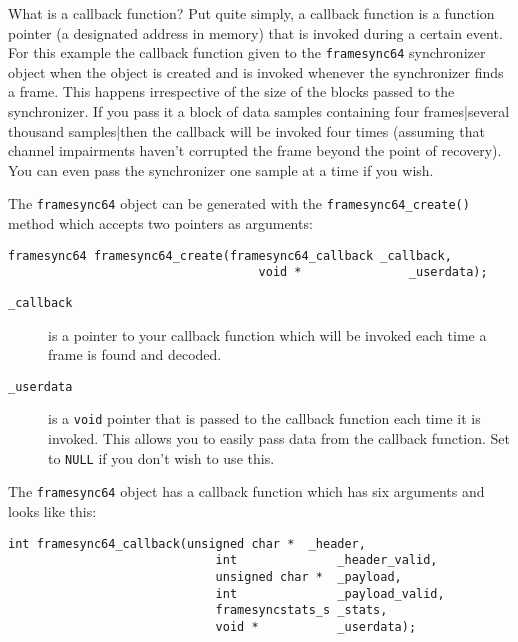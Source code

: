 What is a callback function?
Put quite simply, a callback function is a function pointer
(a designated address in memory)
that is invoked during a certain event.
For this example the callback function given to the {\tt framesync64}
synchronizer object when the object is created
and is invoked whenever the synchronizer finds a frame.
This happens irrespective of the size of the blocks passed to the
synchronizer.
If you pass it a block of data samples containing four frames|several
thousand samples|then the callback will be invoked four times
(assuming that channel impairments haven't corrupted the frame beyond
the point of recovery).
You can even pass the synchronizer one sample at a time if you wish.

The {\tt framesync64} object can be generated with the
{\tt framesync64\_create()} method which accepts two pointers as
arguments:
%
\begin{Verbatim}[fontsize=\small]
    framesync64 framesync64_create(framesync64_callback _callback,
                                   void *               _userdata);
\end{Verbatim}
%
%
\begin{description}
\item[{\tt \_callback}]
    is a pointer to your callback function which will be invoked each
    time a frame is found and decoded.
\item[{\tt \_userdata}]
    is a {\tt void} pointer that is passed to the callback function each
    time it is invoked.
    This allows you to easily pass data from the callback function.
    Set to {\tt NULL} if you don't wish to use this.
\end{description}
%
The {\tt framesync64} object has a callback function which has six
arguments and looks like this:
%
\begin{Verbatim}[fontsize=\small]
    int framesync64_callback(unsigned char *  _header,
                             int              _header_valid,
                             unsigned char *  _payload,
                             int              _payload_valid,
                             framesyncstats_s _stats,
                             void *           _userdata);
\end{Verbatim}
